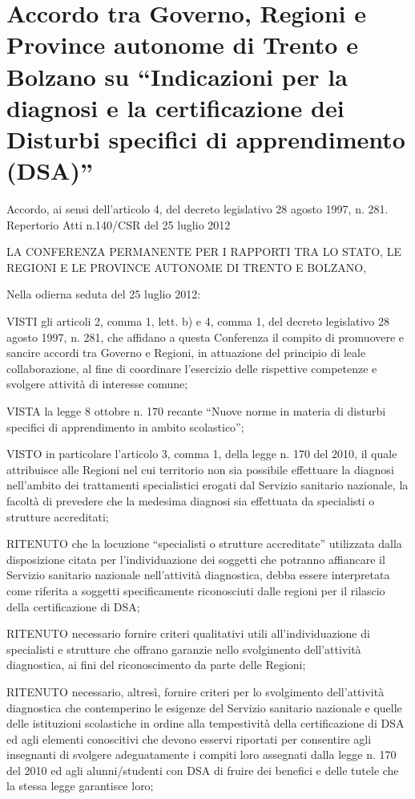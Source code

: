 \chapter[RA 140 del 25 luglio 2012]{Accordo tra Governo, Regioni e Province autonome di Trento e Bolzano su “Indicazioni per la diagnosi e la certificazione dei Disturbi specifici di apprendimento (DSA)”}
Accordo, ai sensi dell’articolo 4, del decreto legislativo 28 agosto 1997, n. 281.
Repertorio Atti n.140/CSR del 25 luglio 2012
\begin{center}
LA CONFERENZA PERMANENTE PER I RAPPORTI TRA LO STATO, LE REGIONI E LE PROVINCE AUTONOME DI TRENTO E BOLZANO,
\end{center}

Nella odierna seduta del 25 luglio 2012:

VISTI gli articoli 2, comma 1, lett. b) e 4, comma 1, del decreto legislativo 28 agosto 1997, n. 281, che affidano a questa Conferenza il compito di promuovere e sancire accordi tra Governo e Regioni, in attuazione del principio di leale collaborazione, al fine di coordinare l'esercizio delle rispettive competenze e svolgere attività di interesse comune;

VISTA la legge 8 ottobre n. 170 recante “Nuove norme in materia di disturbi specifici di apprendimento in ambito scolastico”;

VISTO in particolare l'articolo 3, comma 1, della legge n. 170 del 2010, il quale attribuisce alle Regioni nel cui territorio non sia possibile effettuare la diagnosi nell'ambito dei trattamenti specialistici erogati dal Servizio sanitario nazionale, la facoltà di prevedere che la medesima diagnosi sia effettuata da specialisti o strutture accreditati;

RITENUTO che la locuzione “specialisti o strutture accreditate” utilizzata dalla disposizione citata per l'individuazione dei soggetti che potranno affiancare il Servizio sanitario nazionale nell'attività diagnostica, debba essere interpretata come riferita a soggetti specificamente riconosciuti dalle regioni per il rilascio della certificazione di DSA;

RITENUTO necessario fornire criteri qualitativi utili all'individuazione di specialisti e strutture che offrano garanzie nello svolgimento dell'attività diagnostica, ai fini del riconoscimento da parte delle Regioni;

RITENUTO necessario, altresì, fornire criteri per lo svolgimento dell'attività diagnostica che contemperino le esigenze del Servizio sanitario nazionale e quelle delle istituzioni scolastiche in ordine alla tempestività della certificazione di DSA ed agli elementi conoscitivi che devono esservi riportati per consentire agli insegnanti di svolgere adeguatamente i compiti loro assegnati dalla legge n. 170 del 2010 ed agli alunni/studenti con DSA di fruire dei benefici e delle tutele che la stessa legge garantisce loro;

